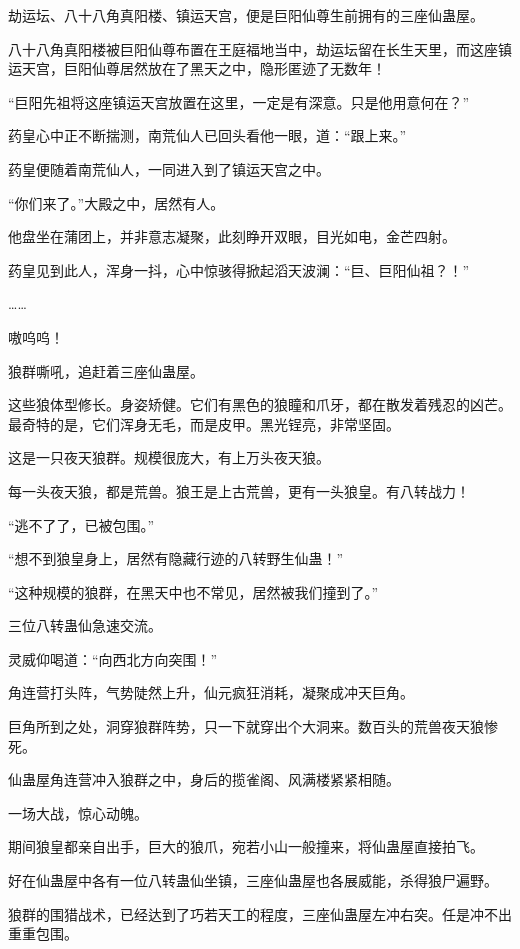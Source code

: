\begin{this_body}
劫运坛、八十八角真阳楼、镇运天宫，便是巨阳仙尊生前拥有的三座仙蛊屋。

八十八角真阳楼被巨阳仙尊布置在王庭福地当中，劫运坛留在长生天里，而这座镇运天宫，巨阳仙尊居然放在了黑天之中，隐形匿迹了无数年！

“巨阳先祖将这座镇运天宫放置在这里，一定是有深意。只是他用意何在？”

药皇心中正不断揣测，南荒仙人已回头看他一眼，道：“跟上来。”

药皇便随着南荒仙人，一同进入到了镇运天宫之中。

“你们来了。”大殿之中，居然有人。

他盘坐在蒲团上，并非意志凝聚，此刻睁开双眼，目光如电，金芒四射。

药皇见到此人，浑身一抖，心中惊骇得掀起滔天波澜：“巨、巨阳仙祖？！”

……

嗷呜呜！

狼群嘶吼，追赶着三座仙蛊屋。

这些狼体型修长。身姿矫健。它们有黑色的狼瞳和爪牙，都在散发着残忍的凶芒。最奇特的是，它们浑身无毛，而是皮甲。黑光锃亮，非常坚固。

这是一只夜天狼群。规模很庞大，有上万头夜天狼。

每一头夜天狼，都是荒兽。狼王是上古荒兽，更有一头狼皇。有八转战力！

“逃不了了，已被包围。”

“想不到狼皇身上，居然有隐藏行迹的八转野生仙蛊！”

“这种规模的狼群，在黑天中也不常见，居然被我们撞到了。”

三位八转蛊仙急速交流。

灵威仰喝道：“向西北方向突围！”

角连营打头阵，气势陡然上升，仙元疯狂消耗，凝聚成冲天巨角。

巨角所到之处，洞穿狼群阵势，只一下就穿出个大洞来。数百头的荒兽夜天狼惨死。

仙蛊屋角连营冲入狼群之中，身后的揽雀阁、风满楼紧紧相随。

一场大战，惊心动魄。

期间狼皇都亲自出手，巨大的狼爪，宛若小山一般撞来，将仙蛊屋直接拍飞。

好在仙蛊屋中各有一位八转蛊仙坐镇，三座仙蛊屋也各展威能，杀得狼尸遍野。

狼群的围猎战术，已经达到了巧若天工的程度，三座仙蛊屋左冲右突。任是冲不出重重包围。


\end{this_body}
